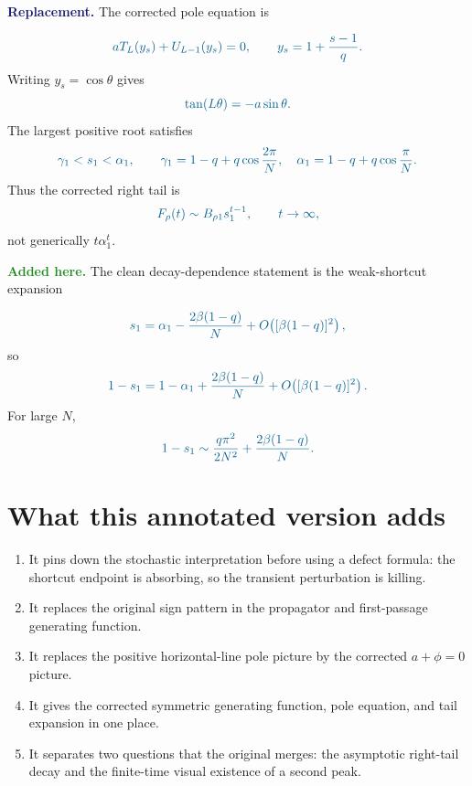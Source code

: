 \documentclass[11pt]{article}
\newcommand{\Corrected}[1]{\textcolor{MidnightBlue}{#1}}
\newcommand{\Fix}[1]{\par\smallskip\noindent\textbf{\textcolor{MidnightBlue}{Replacement.}} #1\par}
\newcommand{\Added}[1]{\par\smallskip\noindent\textbf{\textcolor{ForestGreen}{Added here.}} #1\par}
\begin{document}
\Fix{The corrected pole equation is}
\begin{equation}
  \Corrected{
  aT_L(y_s)+U_{L-1}(y_s)=0,\qquad
  y_s=1+\frac{s-1}{q}.}
  \label{eq:corrected-pole-y}
\end{equation}
Writing $y_s=\cos\theta$ gives
\begin{equation}
  \Corrected{\tan(L\theta)=-a\sin\theta.}
  \label{eq:corrected-pole-theta}
\end{equation}
The largest positive root satisfies
\begin{equation}
  \Corrected{
  \gamma_1<s_1<\alpha_1,\qquad
  \gamma_1=1-q+q\cos\frac{2\pi}{N},\quad
  \alpha_1=1-q+q\cos\frac{\pi}{N}.}
  \label{eq:root-ordering}
\end{equation}
Thus the corrected right tail is
\begin{equation}
  \Corrected{
  F_\rho(t)\sim B_{\rho1}s_1^{t-1},\qquad t\to\infty,}
  \label{eq:corrected-tail}
\end{equation}
not generically $t\alpha_1^t$.

\Added{The clean decay-dependence statement is the weak-shortcut expansion}
\begin{equation}
  \Corrected{
  s_1=\alpha_1-\frac{2\beta(1-q)}{N}
  +O\!\left([\beta(1-q)]^2\right),}
  \label{eq:s1-expansion}
\end{equation}
so
\begin{equation}
  \Corrected{
  1-s_1=1-\alpha_1+\frac{2\beta(1-q)}{N}
  +O\!\left([\beta(1-q)]^2\right).}
  \label{eq:gap-expansion}
\end{equation}
For large $N$,
\begin{equation}
  \Corrected{
  1-s_1\sim \frac{q\pi^2}{2N^2}
  +\frac{2\beta(1-q)}{N}.}
  \label{eq:large-N-gap}
\end{equation}

\section{What this annotated version adds}

\begin{enumerate}
\item It pins down the stochastic interpretation before using a defect formula:
the shortcut endpoint is absorbing, so the transient perturbation is killing.
\item It replaces the original sign pattern in the propagator and first-passage
generating function.
\item It replaces the positive horizontal-line pole picture by the corrected
$a+\phi=0$ picture.
\item It gives the corrected symmetric generating function, pole equation, and
tail expansion in one place.
\item It separates two questions that the original merges: the asymptotic
right-tail decay and the finite-time visual existence of a second peak.
\end{enumerate}
\end{document}
